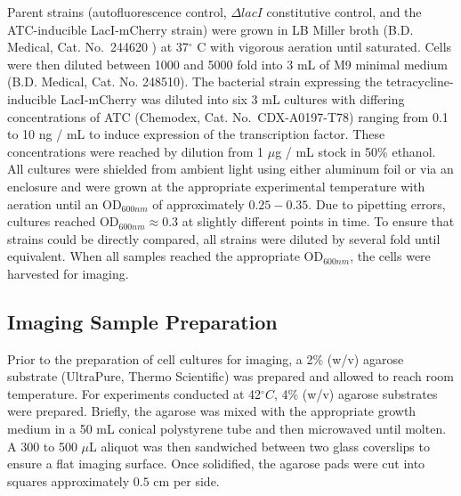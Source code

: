 \documentclass[12pt]{caltech_thesis}
\begin{document}
Parent strains (autofluorescence control, \(\Delta lacI\) constitutive
control, and the ATC-inducible LacI-mCherry strain) were grown in LB
Miller broth (B.D. Medical, Cat. No.~244620 ) at 37\(^\circ\) C with
vigorous aeration until saturated. Cells were then diluted between 1000
and 5000 fold into 3 mL of M9 minimal medium (B.D. Medical, Cat. No.
248510). The bacterial strain expressing the tetracycline-inducible
LacI-mCherry was diluted into six 3 mL cultures with differing
concentrations of ATC (Chemodex, Cat. No.~CDX-A0197-T78) ranging from
0.1 to 10 ng / mL to induce expression of the transcription factor.
These concentrations were reached by dilution from 1 \(\mu\)g / mL stock
in 50\% ethanol. All cultures were shielded from ambient light using
either aluminum foil or via an enclosure and were grown at the
appropriate experimental temperature with aeration until an
OD\(_{600nm}\) of approximately \(0.25 - 0.35\). Due to pipetting
errors, cultures reached OD\(_{600nm} \approx 0.3\) at slightly
different points in time. To ensure that strains could be directly
compared, all strains were diluted by several fold until equivalent.
When all samples reached the appropriate OD\(_{600nm}\), the cells were
harvested for imaging.

\hypertarget{imaging-sample-preparation}{%
\subsection{Imaging Sample
Preparation}\label{imaging-sample-preparation}}

Prior to the preparation of cell cultures for imaging, a 2\% (w/v)
agarose substrate (UltraPure, Thermo Scientific) was prepared and
allowed to reach room temperature. For experiments conducted at
42\(^\circ C\), 4\% (w/v) agarose substrates were prepared. Briefly, the
agarose was mixed with the appropriate growth medium in a 50 mL conical
polystyrene tube and then microwaved until molten. A 300 to 500 \(\mu\)L
aliquot was then sandwiched between two glass coverslips to ensure a
flat imaging surface. Once solidified, the agarose pads were cut into
squares approximately \(0.5\) cm per side.
\end{document}
